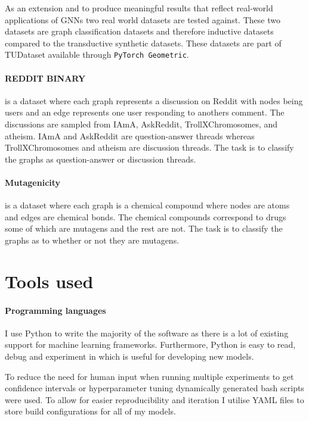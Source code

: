 As an extension and to produce meaningful results that reflect real-world applications of GNNs two real world datasets are tested against.
These two datasets are graph classification datasets and therefore inductive datasets compared to the transductive synthetic datasets.
These datasets are part of TUDataset \cite{Morris+2020} available through \texttt{PyTorch Geometric}\cite{Fey/Lenssen/2019}.

\paragraph{REDDIT BINARY}
is a dataset where each graph represents a discussion on Reddit with nodes being users and an edge represents one user responding to anothers comment.
The discussions are sampled from IAmA, AskReddit, TrollXChromosomes, and atheism.
IAmA and AskReddit are question-answer threads whereas TrollXChromosomes and atheism are discussion threads.
The task is to classify the graphs as question-answer or discussion threads.

\paragraph{Mutagenicity}
is a dataset where each graph is a chemical compound where nodes are atoms and edges are chemical bonds.
The chemical compounds correspond to drugs some of which are mutagens and the rest are not.
The task is to classify the graphs as to whether or not they are mutagens.

\section{Tools used}


\paragraph{Programming languages}
I use Python to write the majority of the software as there is a lot of existing support for machine learning frameworks.
Furthermore, Python is easy to read, debug and experiment in which is useful for developing new models.

To reduce the need for human input when running multiple experiments to get confidence intervals or hyperparameter tuning dynamically generated bash scripts were used.
To allow for easier reproducibility and iteration I utilise YAML files to store build configurations for all of my models.

